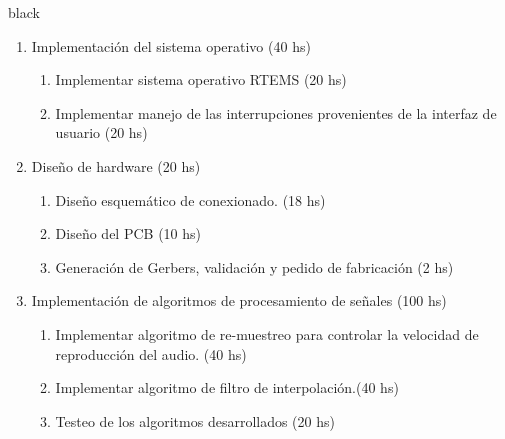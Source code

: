 \documentclass[11pt]{charter}
\begin{document}
\begin{consigna}{black}
\begin{enumerate}
\begin{enumerate}
	\end{enumerate}
\item Implementación del sistema operativo (40 hs)
	\begin{enumerate}
	\item Implementar sistema operativo RTEMS (20 hs)
	\item Implementar manejo de las interrupciones provenientes de la interfaz de usuario (20 hs) 
	\end{enumerate}
\item Diseño de hardware (20 hs)
	\begin{enumerate}
	\item Diseño esquemático de conexionado. (18 hs)
	\item Diseño del PCB (10 hs)
	\item Generación de Gerbers, validación y pedido de fabricación (2 hs)
	\end{enumerate}
\item Implementación de algoritmos de procesamiento de señales (100 hs)
	\begin{enumerate}
	\item Implementar algoritmo de re-muestreo para controlar la velocidad de reproducción del audio. (40 hs)
	\item Implementar algoritmo de filtro de interpolación.(40 hs)
	\item Testeo de los algoritmos desarrollados (20 hs)
	\end{enumerate}


\end{enumerate}
\end{consigna}
\end{document}
